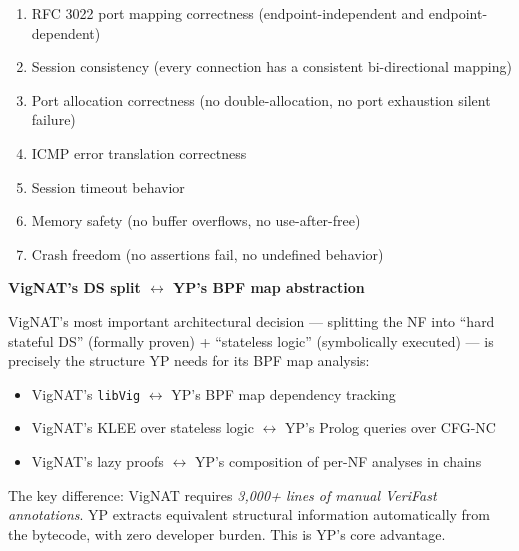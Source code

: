 \begin{enumerate}
  \item RFC 3022 port mapping correctness (endpoint-independent and endpoint-dependent)
  \item Session consistency (every connection has a consistent bi-directional mapping)
  \item Port allocation correctness (no double-allocation, no port exhaustion silent failure)
  \item ICMP error translation correctness
  \item Session timeout behavior
  \item Memory safety (no buffer overflows, no use-after-free)
  \item Crash freedom (no assertions fail, no undefined behavior)
\end{enumerate}

\begin{analogybox}
\textbf{VigNAT's DS split $\leftrightarrow$ YP's BPF map abstraction}

VigNAT's most important architectural decision --- splitting the NF into ``hard stateful DS'' (formally proven) + ``stateless logic'' (symbolically executed) --- is precisely the structure YP needs for its BPF map analysis:

\begin{itemize}
  \item VigNAT's \texttt{libVig} $\leftrightarrow$ YP's BPF map dependency tracking
  \item VigNAT's KLEE over stateless logic $\leftrightarrow$ YP's Prolog queries over CFG-NC
  \item VigNAT's lazy proofs $\leftrightarrow$ YP's composition of per-NF analyses in chains
\end{itemize}

The key difference: VigNAT requires \emph{3,000+ lines of manual VeriFast annotations}. YP extracts equivalent structural information automatically from the bytecode, with zero developer burden. This is YP's core advantage.
\end{analogybox}

